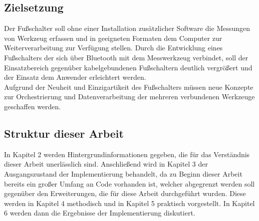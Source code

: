 \subsection{Zielsetzung}
Der Fußschalter soll ohne einer Installation zusätzlicher Software die Messungen von Werkzeug erfassen und in geeigneten Formaten dem Computer zur Weiterverarbeitung zur Verfügung stellen. Durch die Entwicklung eines Fußschalters der sich über Bluetooth mit dem Messwerkzeug verbindet, soll der Einsatzbereich gegenüber kabelgebundenen Fußschaltern deutlich vergrößert und der Einsatz dem Anwender erleichtert werden.\\
Aufgrund der Neuheit und Einzigartikeit des Fußschalters müssen neue Konzepte zur Orchestrierung und Datenverarbeitung der mehreren verbundenen Werkzeuge geschaffen werden.

\subsection{Struktur dieser Arbeit}
In Kapitel 2 werden Hintergrundinformationen gegeben, die für das Verständnis dieser Arbeit unerlässlich sind. Anschließend wird in Kapitel 3 der Ausgangszustand der Implementierung behandelt, da zu Beginn dieser Arbeit bereits ein großer Umfang an Code vorhanden ist, welcher abgegrenzt werden soll gegenüber den Erweiterungen, die für diese Arbeit durchgeführt wurden. Diese werden in Kapitel 4 methodisch und in Kapitel 5 praktisch vorgestellt. In Kapitel 6 werden dann die Ergebnisse der Implementierung diskutiert.